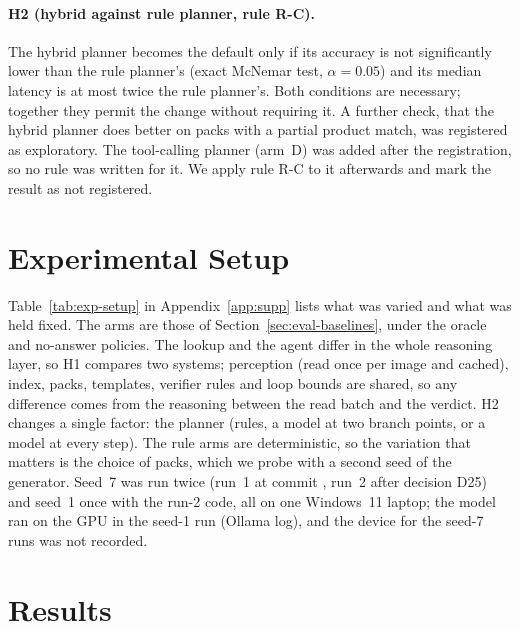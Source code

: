 \paragraph{H2 (hybrid against rule planner, rule R-C).} The hybrid planner becomes the default only
if its accuracy is not significantly lower than the rule planner's (exact McNemar test,
$\alpha=0.05$) and its median latency is at most twice the rule planner's. Both conditions are
necessary; together they permit the change without requiring it. A further check, that the hybrid
planner does better on packs with a partial product match, was registered as exploratory. The
tool-calling planner (arm~D) was added after the registration, so no rule was written for it. We
apply rule R-C to it afterwards and mark the result as not registered.

\section{Experimental Setup}
\label{sec:exp-experimental-setup}

Table~\ref{tab:exp-setup} in Appendix~\ref{app:supp} lists what was varied and what was held
fixed. The arms are those of Section~\ref{sec:eval-baselines}, under the oracle and no-answer
policies. The lookup and the agent differ in the whole reasoning layer, so H1 compares two systems;
perception (read once per image and cached), index, packs, templates, verifier rules and loop bounds
are shared, so any difference comes from the reasoning between the read batch and the verdict. H2
changes a single factor: the planner (rules, a model at two branch points, or a model at every step). The rule arms are deterministic, so
the variation that matters is the choice of packs, which we probe with a second seed of the
generator. Seed~7 was run twice (run~1 at commit \texttt{\RunOneCommit}, run~2 after decision D25)
and seed~1 once with the run-2 code, all on one Windows~11 laptop; the model ran on the GPU in the
seed-1 run (Ollama log), and the device for the seed-7 runs was not recorded.

\section{Results}
\label{sec:exp-results}

